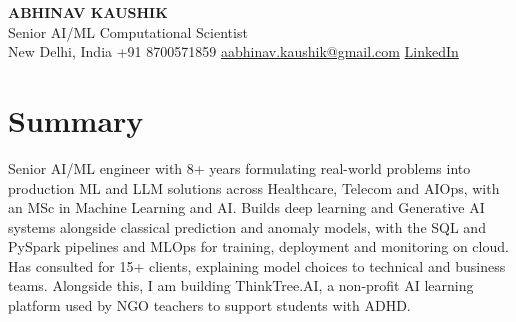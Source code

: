 \documentclass[10pt,a4paper]{article}
\begin{document}
\begin{center}
  {\LARGE\bfseries ABHINAV KAUSHIK}\\[2pt]
  {\large Senior AI/ML Computational Scientist}\\[2pt]
  New Delhi, India \textbar{} +91 8700571859 \textbar{} \href{mailto:aabhinav.kaushik@gmail.com}{aabhinav.kaushik@gmail.com} \textbar{} \href{https://www.linkedin.com/in/abhinav-kaushik10/}{LinkedIn}  
\end{center}

\section{Summary}
Senior AI/ML engineer with 8+ years formulating real-world problems into production ML and LLM solutions across Healthcare, Telecom and AIOps, with an MSc in Machine Learning and AI. Builds deep learning and Generative AI systems alongside classical prediction and anomaly models, with the SQL and PySpark pipelines and MLOps for training, deployment and monitoring on cloud. Has consulted for 15+ clients, explaining model choices to technical and business teams. Alongside this, I am building ThinkTree.AI, a non-profit AI learning platform used by NGO teachers to support students with ADHD.
\end{document}
